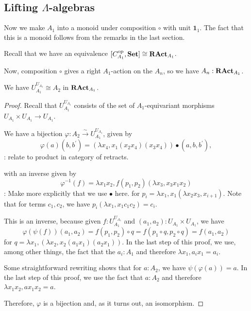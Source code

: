 \subsection{Lifting \texorpdfstring{$ \Lambda $}{Lambda}-algebras}

\begin{definition}
  Now we make $ A_1 $ into a monoid under composition $ \circ $ with unit $ \mathbf 1_1 $. The fact that this is a monoid follows from the remarks in the last section.
\end{definition}

Recall that we have an equivalence $ [C_{A_1}^{\text{op}}, \mathbf{Set}] \cong \mathbf{RAct}_{A_1} $.

\begin{definition}
  Now, composition $ \circ $ gives a right $ A_1 $-action on the $ A_n $, so we have $ A_n : \mathbf{RAct}_{A_1} $.
\end{definition}

\begin{lemma}
  We have $ U_{A_1}^{U_{A_1}} \cong A_2 $ in $ \mathbf{RAct}_{A_1} $.
\end{lemma}
\begin{proof}
  Recall that $ U_{A_1}^{U_{A_1}} $ consists of the set of $ A_1 $-equivariant morphisms $ U_{A_1} \times U_{A_1} \to U_{A_1} $.

  We have a bijection $ \varphi: A_2 \xrightarrow{\sim} U_{A_1}^{U_{A_1}} $, given by
  \[ \varphi(a)(b, b^\prime) = (\lambda x_4, x_1 (x_2 x_4) (x_3 x_4)) \bullet (a, b, b^\prime), \]
  \TODO: relate to product in category of retracts.

  with an inverse given by
  \[ \varphi^{-1}(f) = \lambda x_1 x_2, f(p_1, p_2)(\lambda x_3, x_3 x_1 x_2) \]
  \TODO: Make more explicitly that we use $ \bullet $ here.
  for $ p_i = \lambda x_1, x_1 (\lambda x_2 x_3, x_{i + 1}) $. Note that for terms $ c_1, c_2 $, we have $ p_i (\lambda x_1, x_1 c_1 c_2) = c_i $.

  This is an inverse, because given $ f: U_{A_1}^{U_{A_1}} $ and $ (a_1, a_2): U_{A_1} \times U_{A_1} $, we have
  \[ \varphi(\psi(f))(a_1, a_2) = f(p_1, p_2) \circ q = f(p_1 \circ q, p_2 \circ q) = f(a_1, a_2) \]
  for $ q = \lambda x_1, (\lambda x_2, x_2 (a_1 x_1) (a_2 x_1)) $. In the last step of this proof, we use, among other things, the fact that the $ a_i : A_1 $ and therefore $ \lambda x_1, a_i x_1 = a_i $.

  Some straightforward rewriting shows that for $ a: A_2 $, we have $ \psi(\varphi(a)) = a $. In the last step of this proof, we use the fact that $ a : A_2 $ and therefore $ \lambda x_1 x_2, a x_1 x_2 = a $.

  Therefore, $ \varphi $ is a bijection and, as it turns out, an isomorphism.
\end{proof}

